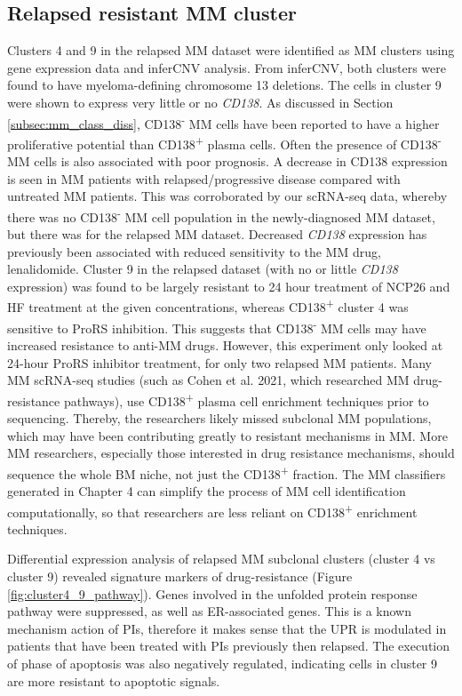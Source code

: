 \subsection{Relapsed resistant MM cluster}
Clusters 4 and 9 in the relapsed MM dataset were identified as MM clusters using gene expression data and inferCNV analysis.
From inferCNV, both clusters were found to have myeloma-defining chromosome 13 deletions.
The cells in cluster 9 were shown to express very little or no \textit{CD138}.
As discussed in Section \ref{subsec:mm_class_diss}, CD138\textsuperscript{-} MM cells have been reported to have a higher proliferative potential than CD138\textsuperscript{+} plasma cells.
Often the presence of CD138\textsuperscript{-} MM cells is also associated with poor prognosis.
A decrease in CD138 expression is seen in MM patients with relapsed/progressive disease compared with untreated MM patients\cite{kawano2012multiple}.
This was corroborated by our scRNA-seq data, whereby there was no CD138\textsuperscript{-} MM cell population in the newly-diagnosed MM dataset, but there was for the relapsed MM dataset.
Decreased \textit{CD138} expression has previously been associated with reduced sensitivity to the MM drug, lenalidomide\cite{kawano2012multiple}.
Cluster 9 in the relapsed dataset (with no or little \textit{CD138} expression) was found to be largely resistant to 24 hour treatment of NCP26 and HF treatment at the given concentrations, whereas CD138\textsuperscript{+} cluster 4 was sensitive to ProRS inhibition.
This suggests that CD138\textsuperscript{-} MM cells may have increased resistance to anti-MM drugs.
However, this experiment only looked at 24-hour ProRS inhibitor treatment, for only two relapsed MM patients.
Many MM scRNA-seq studies (such as Cohen et al. 2021, which researched MM drug-resistance pathways\cite{cohen2021identification}), use CD138\textsuperscript{+} plasma cell enrichment techniques prior to sequencing.
Thereby, the researchers likely missed subclonal MM populations, which may have been contributing greatly to resistant mechanisms in MM\@.
More MM researchers, especially those interested in drug resistance mechanisms, should sequence the whole BM niche, not just the CD138\textsuperscript{+} fraction.
The MM classifiers generated in Chapter 4 can simplify the process of MM cell identification computationally, so that researchers are less reliant on CD138\textsuperscript{+} enrichment techniques.

Differential expression analysis of relapsed MM subclonal clusters (cluster 4 vs cluster 9) revealed signature markers of drug-resistance (Figure \ref{fig:cluster4_9_pathway}).
Genes involved in the unfolded protein response pathway were suppressed, as well as ER-associated genes.
This is a known mechanism action of PIs, therefore it makes sense that the UPR is modulated in patients that have been treated with PIs previously then relapsed.
The execution of phase of apoptosis was also negatively regulated, indicating cells in cluster 9 are more resistant to apoptotic signals.

